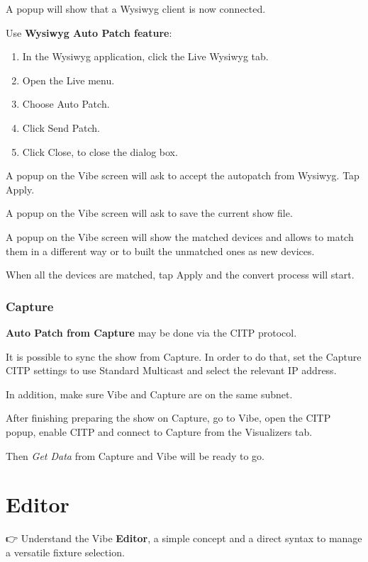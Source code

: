 \documentclass[
]{article}
\begin{document}
A popup will show that a Wysiwyg client is now connected.

Use \textbf{Wysiwyg Auto Patch feature}:

\begin{enumerate}
\def\labelenumi{\arabic{enumi}.}
\item
  In the Wysiwyg application, click the Live Wysiwyg tab.
\item
  Open the Live menu.
\item
  Choose Auto Patch.
\item
  Click Send Patch.
\item
  Click Close, to close the dialog box.
\end{enumerate}

A popup on the Vibe screen will ask to accept the autopatch from Wysiwyg. Tap Apply.

A popup on the Vibe screen will ask to save the current show file.

A popup on the Vibe screen will show the matched devices and allows to match them in a different way or to built the unmatched ones as new devices.

When all the devices are matched, tap Apply and the convert process will start.

\hypertarget{capture-1}{%
\subsubsection{Capture}\label{capture-1}}

\textbf{Auto Patch from Capture} may be done via the CITP protocol.

It is possible to sync the show from Capture. In order to do that, set the Capture CITP settings to use Standard Multicast and select the relevant IP address.

In addition, make sure Vibe and Capture are on the same subnet.

After finishing preparing the show on Capture, go to Vibe, open the CITP popup, enable CITP and connect to Capture from the Visualizers tab.

Then \emph{Get Data} from Capture and Vibe will be ready to go.

\hypertarget{editor}{%
\section{Editor}\label{editor}}

👉 Understand the Vibe \textbf{Editor}, a simple concept and a direct syntax to manage a versatile fixture selection.
\end{document}
